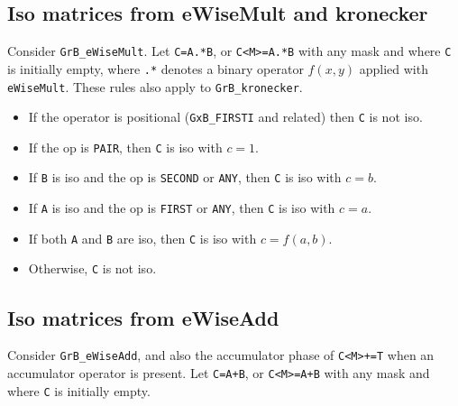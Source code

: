 \documentclass[12pt]{article}
\begin{document}
\subsection{Iso matrices from eWiseMult and kronecker}
\label{iso_emult}

Consider \verb'GrB_eWiseMult'.  Let
\verb'C=A.*B', or \verb'C<M>=A.*B' with any mask and where \verb'C' is
initially empty, where \verb'.*' denotes a binary operator $f(x,y)$
applied with \verb'eWiseMult'.  These rules also apply to \verb'GrB_kronecker'.

    \begin{itemize}
    \item If the operator is positional (\verb'GxB_FIRSTI' and related) then
    \verb'C' is not iso.

    \item If the op is \verb'PAIR',
        then \verb'C' is iso with $c=1$.

    \item If \verb'B' is iso and the op is \verb'SECOND' or \verb'ANY',
        then \verb'C' is iso with $c=b$.

    \item If \verb'A' is iso and the op is \verb'FIRST' or \verb'ANY',
        then \verb'C' is iso with $c=a$.

    \item If both \verb'A' and \verb'B' are iso,
        then \verb'C' is iso with $c=f(a,b)$.

    \item Otherwise, \verb'C' is not iso.
    \end{itemize}

\subsection{Iso matrices from eWiseAdd}
\label{iso_add}

Consider \verb'GrB_eWiseAdd', and also the accumulator phase of \verb'C<M>+=T'
when an accumulator operator is present.  Let \verb'C=A+B', or \verb'C<M>=A+B'
with any mask and where \verb'C' is initially empty.
\end{document}
